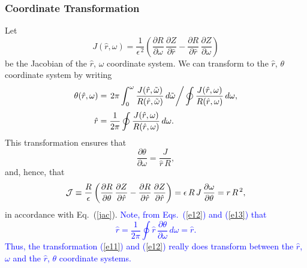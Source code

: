 \documentclass[12pt,prb,aps]{revtex4-1}
\begin{document}
\subsubsection{Coordinate Transformation}\label{trans}
Let
\begin{equation}\label{e10}
J(\hat{r},\omega) = \frac{1}{\epsilon^{\,2}}\left(\frac{\partial R}{\partial\omega}\,\frac{\partial Z}{\partial \hat{r}} -\frac{\partial R}{\partial \hat{r}}\,\frac{\partial Z}{\partial \omega}\right)
\end{equation}
be the Jacobian of the $\hat{r}$, $\omega$ coordinate system. We can transform to the $\hat{r}$, $\theta$ coordinate system 
by writing
\begin{align}\label{e11}
\theta(\hat{r},\omega) &= \left.2\pi\int_0^\omega \frac{J(\hat{r},\tilde{\omega})}{R(\hat{r},\tilde{\omega})}\,d\tilde{\omega}\right/\oint\frac{J(\hat{r},\omega)}{R(\hat{r},\omega)}\,d\omega,\\[0.5ex]
\hat{r}&=\frac{1}{2\pi}\oint\frac{J(\hat{r},\omega)}{R(\hat{r},\omega)}\,d\omega.\label{e12}
\end{align}
This transformation ensures that 
\begin{equation}\label{e13}
\frac{\partial\theta}{\partial\omega} = \frac{J}{\hat{r}\,R},
\end{equation}
and, hence, that 
\begin{equation}
{\cal J} \equiv \frac{R}{\epsilon} \left(\frac{\partial R}{\partial\theta}\,\frac{\partial Z}{\partial \hat{r}} -\frac{\partial R}{\partial \hat{r}}\,\frac{\partial Z}{\partial \hat{r}}\right)
=\epsilon\, R\,J\,\frac{\partial\omega}{\partial\theta} =r\,R^{\,2},
\end{equation}
in accordance with Eq.~(\ref{jac}). \textcolor{blue}{ Note, from Eqs.~(\ref{e12}) and (\ref{e13}) that
\begin{equation}
\hat{r}=\frac{1}{2\pi}\oint \hat{r}\,\frac{\partial\theta}{\partial \omega}\,d\omega=\hat{r}.
\end{equation}
Thus, the transformation (\ref{e11}) and (\ref{e12}) really does transform between the $\hat{r}$, $\omega$ and the $\hat{r}$, $\theta$
coordinate systems. }
\end{document}
